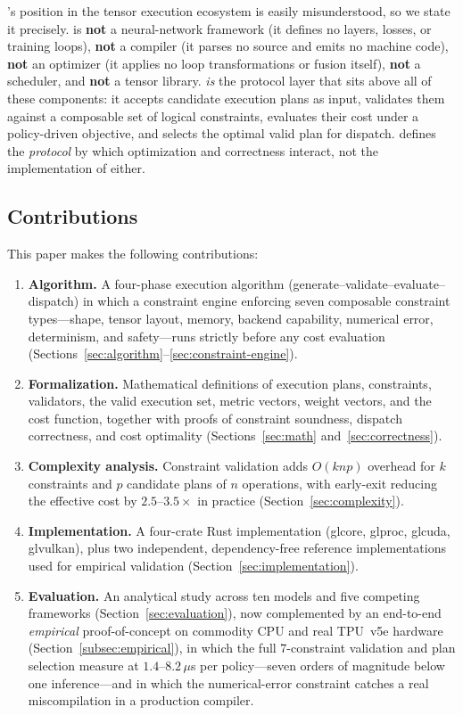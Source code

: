 \gate{}'s position in the tensor execution ecosystem is easily
misunderstood, so we state it precisely. \gate{} is \textbf{not} a
neural-network framework (it defines no layers, losses, or training
loops), \textbf{not} a compiler (it parses no source and emits no
machine code), \textbf{not} an optimizer (it applies no loop
transformations or fusion itself), \textbf{not} a scheduler, and
\textbf{not} a tensor library. \gate{} \emph{is} the protocol layer that
sits above all of these components: it accepts candidate execution plans
as input, validates them against a composable set of logical
constraints, evaluates their cost under a policy-driven objective, and
selects the optimal valid plan for dispatch. \gate{} defines the
\emph{protocol} by which optimization and correctness interact, not the
implementation of either.

\subsection{Contributions}

This paper makes the following contributions:

\begin{enumerate}[leftmargin=2em]
  \item \textbf{Algorithm.} A four-phase execution algorithm
    (generate--validate--evaluate--dispatch) in which a constraint
    engine enforcing seven composable constraint types---shape, tensor
    layout, memory, backend capability, numerical error, determinism,
    and safety---runs strictly before any cost evaluation
    (Sections~\ref{sec:algorithm}--\ref{sec:constraint-engine}).
  \item \textbf{Formalization.} Mathematical definitions of execution
    plans, constraints, validators, the valid execution set, metric
    vectors, weight vectors, and the cost function, together with proofs
    of constraint soundness, dispatch correctness, and cost optimality
    (Sections~\ref{sec:math} and~\ref{sec:correctness}).
  \item \textbf{Complexity analysis.} Constraint validation adds
    $O(knp)$ overhead for $k$ constraints and $p$ candidate plans of $n$
    operations, with early-exit reducing the effective cost by
    $2.5$--$3.5\times$ in practice (Section~\ref{sec:complexity}).
  \item \textbf{Implementation.} A four-crate Rust implementation
    (glcore, glproc, glcuda, glvulkan), plus two independent,
    dependency-free reference implementations used for empirical
    validation (Section~\ref{sec:implementation}).
  \item \textbf{Evaluation.} An analytical study across ten models and
    five competing frameworks (Section~\ref{sec:evaluation}), now
    complemented by an end-to-end \emph{empirical} proof-of-concept on
    commodity CPU and real TPU~v5e hardware
    (Section~\ref{subsec:empirical}), in which the full 7-constraint
    validation and plan selection measure at $1.4$--$8.2\,\mu$s per
    policy---seven orders of magnitude below one inference---and in
    which the numerical-error constraint catches a real miscompilation
    in a production compiler.
\end{enumerate}
